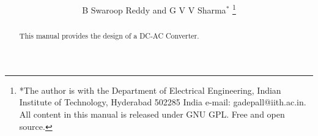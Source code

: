 \documentclass[journal,12pt,twocolumn]{IEEEtran}
\begin{document}









\def\putbox#1#2#3{\makebox[0in][l]{\makebox[#1][l]{}\raisebox{\baselineskip}[0in][0in]{\raisebox{#2}[0in][0in]{#3}}}}
     \def\rightbox#1{\makebox[0in][r]{#1}}
     \def\centbox#1{\makebox[0in]{#1}}
     \def\topbox#1{\raisebox{-\baselineskip}[0in][0in]{#1}}
     \def\midbox#1{\raisebox{-0.5\baselineskip}[0in][0in]{#1}}

\vspace{3cm}

\title{ 
}

\author{B Swaroop Reddy and  G V V Sharma$^{*}$%
	\thanks{*The author is with the Department
		of Electrical Engineering, Indian Institute of Technology, Hyderabad
		502285 India e-mail:  gadepall@iith.ac.in. All content in this manual is released under GNU GPL.  Free and open source.}
	
}	

\maketitle

\tableofcontents
\bigskip

\begin{abstract}
	
	This manual provides the design of a DC-AC Converter.
	
\end{abstract}

\end{document}
